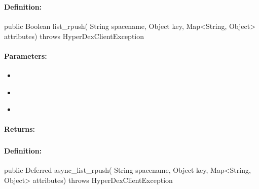 \subsubsection{}
\label{api:java:list_rpush}


\paragraph{Definition:}
\begin{javacode}
public Boolean list_rpush(
        String spacename,
        Object key,
        Map<String, Object> attributes) throws HyperDexClientException
\end{javacode}

\paragraph{Parameters:}
\begin{itemize}[noitemsep]
\item {}\\

\item {}\\

\item {}\\

\end{itemize}

\paragraph{Returns:}


\pagebreak
\subsubsection{}
\label{api:java:async_list_rpush}


\paragraph{Definition:}
\begin{javacode}
public Deferred async_list_rpush(
        String spacename,
        Object key,
        Map<String, Object> attributes) throws HyperDexClientException
\end{javacode}

